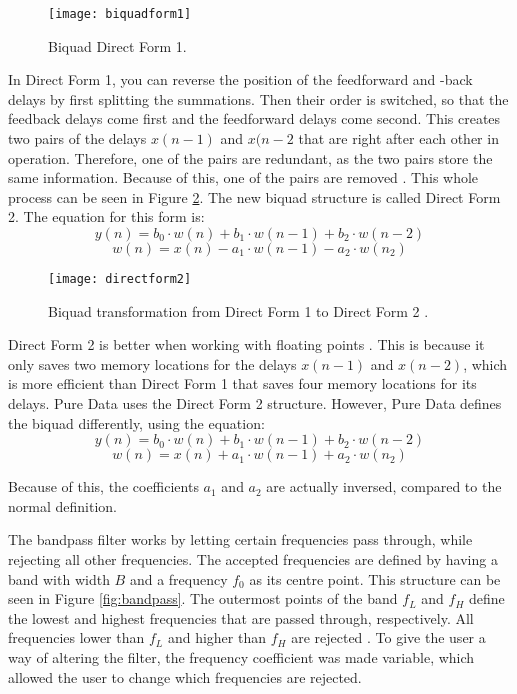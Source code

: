 \begin{figure}
\centering
\texttt{[image: biquadform1]}
\caption{Biquad Direct Form 1.}
\label{fig:biquadform1}
\end{figure}

In Direct Form 1, you can reverse the position of the feedforward and -back delays by first splitting the summations. Then their order is switched, so that the feedback delays come first and the feedforward delays come second. This creates two pairs of the delays \(x(n-1)\) and \(x(n-2\) that are right after each other in operation. Therefore, one of the pairs are redundant, as the two pairs store the same information. Because of this, one of the pairs are removed \cite{Redmon2003}. This whole process can be seen in Figure \ref{fig:biquadtransform}. The new biquad structure is called Direct Form 2. The equation for this form is\cite{Nederland2016}:
\[y(n) = b_0 \cdot w(n) + b_1 \cdot w(n-1) + b_2 \cdot w(n-2)\]
\[w(n) = x(n) - a_1 \cdot w(n-1) - a_2 \cdot w(n_2)\]

\begin{figure}
\centering
\texttt{[image: directform2]}
\caption{Biquad transformation from Direct Form 1 to Direct Form 2 \cite{Redmon2003}.}
\label{fig:biquadtransform}
\end{figure}

Direct Form 2 is better when working with floating points \cite{Redmon2003}. This is because it only saves two memory locations for the delays \(x(n-1)\) and \(x(n-2)\), which is more efficient than Direct Form 1 that saves four memory locations for its delays. Pure Data uses the Direct Form 2 structure. However, Pure Data defines the biquad differently, using the equation:
\[y(n) = b_0 \cdot w(n) + b_1 \cdot w(n-1) + b_2 \cdot w(n-2)\]
\[w(n) = x(n) + a_1 \cdot w(n-1) + a_2 \cdot w(n_2)\]

Because of this, the coefficients \(a_1\) and \(a_2\) are actually inversed, compared to the normal definition.

The bandpass filter works by letting certain frequencies pass through, while rejecting all other frequencies. The accepted frequencies are defined by having a band with width \(B\) and a frequency \(f_0\) as its  centre point. This structure can be seen in Figure \ref{fig:bandpass}. The outermost points of the band \(f_L\) and \(f_H\) define the lowest and highest frequencies that are passed through, respectively. All frequencies lower than \(f_L\) and higher than \(f_H\) are rejected \cite{zolzer2011dafx}. To give the user a way of altering the filter, the frequency coefficient was made variable, which allowed the user to change which frequencies are rejected. 

